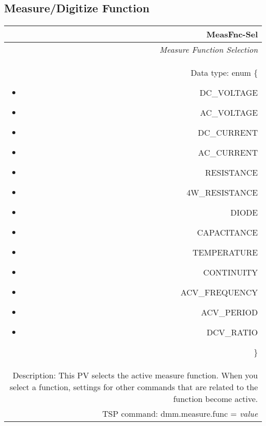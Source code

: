 \documentclass[openany]{article}
\begin{document}
	\subsection{Measure/Digitize Function}\label{pvgroup:function}

		\paragraph{} %

		\begin{tabular}{N}
			\hline
			\bfseries MeasFnc-Sel \\ \hline
			\emph{Measure Function Selection} \\
			Data type: enum \{\begin{itemize}[noitemsep]
				\small
				\item[] DC\_VOLTAGE
				\item[] AC\_VOLTAGE
				\item[] DC\_CURRENT
				\item[] AC\_CURRENT
				\item[] RESISTANCE
				\item[] 4W\_RESISTANCE
				\item[] DIODE
				\item[] CAPACITANCE
				\item[] TEMPERATURE
				\item[] CONTINUITY
				\item[] ACV\_FREQUENCY
				\item[] ACV\_PERIOD
				\item[] DCV\_RATIO
			\end{itemize}\} \\
			Description: This PV selects the active measure function. When you select a function, settings for other commands that are related to the function become active. \\
			TSP command: dmm.measure.func = \emph{value}
		\end{tabular}
\end{document}
